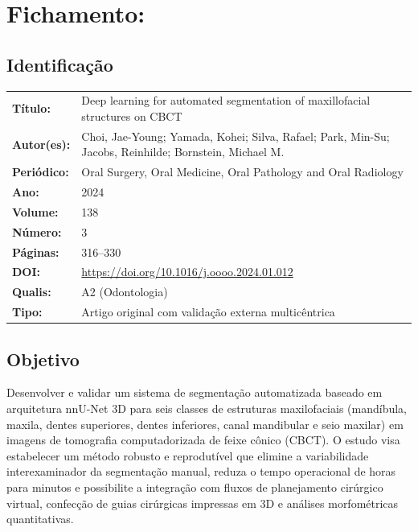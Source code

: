 \section{Fichamento: }

\subsection{Identificação}
\begin{tabular}{ll}
\textbf{Título:} & Deep learning for automated segmentation of maxillofacial
structures on CBCT \\
\textbf{Autor(es):} & Choi, Jae-Young; Yamada, Kohei; Silva, Rafael;
Park, Min-Su; Jacobs, Reinhilde; Bornstein, Michael M. \\
\textbf{Periódico:} & Oral Surgery, Oral Medicine, Oral Pathology and Oral Radiology \\
\textbf{Ano:} & 2024 \\
\textbf{Volume:} & 138 \\
\textbf{Número:} & 3 \\
\textbf{Páginas:} & 316--330 \\
\textbf{DOI:} & \url{https://doi.org/10.1016/j.oooo.2024.01.012} \\
\textbf{Qualis:} & A2 (Odontologia) \\
\textbf{Tipo:} & Artigo original com validação externa multicêntrica \\
\end{tabular}

\subsection{Objetivo}
Desenvolver e validar um sistema de segmentação automatizada baseado em
arquitetura nnU-Net 3D para seis classes de estruturas maxilofaciais
(mandíbula, maxila, dentes superiores, dentes inferiores, canal
mandibular e seio maxilar) em imagens de tomografia computadorizada de
feixe cônico (CBCT). O estudo visa estabelecer um método robusto e
reprodutível que elimine a variabilidade interexaminador da segmentação
manual, reduza o tempo operacional de horas para minutos e possibilite
a integração com fluxos de planejamento cirúrgico virtual, confecção de
guias cirúrgicas impressas em 3D e análises morfométricas quantitativas.

